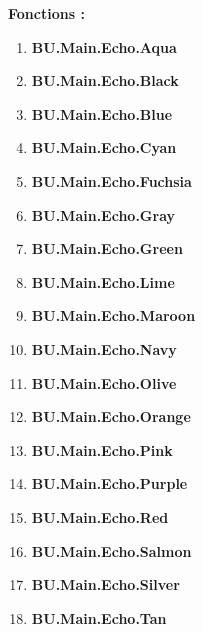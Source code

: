 \documentclass[a4paper,10pt]{article}
\begin{document}
    \begin{justify}
        \textbf{Fonctions :}
        \begin{enumerate}
            \item \textbf{\color{Aqua}BU.Main.Echo.Aqua}\setlength{\parskip}{0em}
            \item \textbf{\color{text}BU.Main.Echo.Black}
            \item \textbf{\color{Blue}BU.Main.Echo.Blue}

            \setlength{\parskip}{1em}

            \item \textbf{\color{Cyan}BU.Main.Echo.Cyan}\setlength{\parskip}{0em}
            \item \textbf{\color{Fuchsia}BU.Main.Echo.Fuchsia}
            \item \textbf{\color{Gray}BU.Main.Echo.Gray}

            \setlength{\parskip}{1em}

            \item \textbf{\color{Green}BU.Main.Echo.Green}\setlength{\parskip}{0em}
            \item \textbf{\color{Lime}BU.Main.Echo.Lime}
            \item \textbf{\color{Maroon}BU.Main.Echo.Maroon}

            \setlength{\parskip}{1em}

            \item \textbf{\color{Navy}BU.Main.Echo.Navy}\setlength{\parskip}{0em}
            \item \textbf{\color{Olive}BU.Main.Echo.Olive}
            \item \textbf{\color{Orange}BU.Main.Echo.Orange}

            \setlength{\parskip}{1em}

            \item \textbf{\color{Pink}BU.Main.Echo.Pink}\setlength{\parskip}{0em}
            \item \textbf{\color{Purple}BU.Main.Echo.Purple}
            \item \textbf{\color{Red}BU.Main.Echo.Red}

            \setlength{\parskip}{1em}

            \item \textbf{\color{Salmon}BU.Main.Echo.Salmon}\setlength{\parskip}{0em}
            \item \textbf{\color{Silver}BU.Main.Echo.Silver}
            \item \textbf{\color{Tan}BU.Main.Echo.Tan}


\end{enumerate}
\end{justify}
\end{document}
